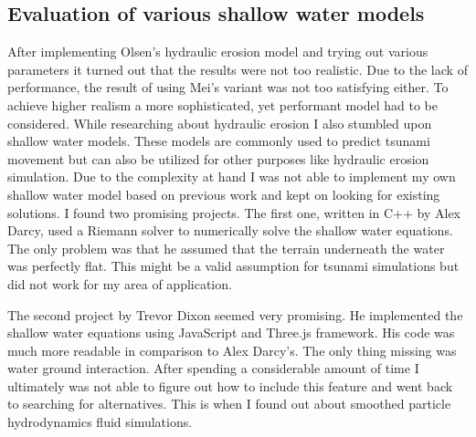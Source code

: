 \documentclass[11pt,a4paper,twoside,openright]{report}
\begin{document}
\subsection{Evaluation of various shallow water models}
After implementing Olsen's hydraulic erosion model and trying out various parameters it turned out that the results were not too realistic. Due to the lack of performance, the result of using Mei's variant was not too satisfying either. To achieve higher realism a more sophisticated, yet performant model had to be considered. While researching about hydraulic erosion I also stumbled upon shallow water models. These models are commonly used to predict tsunami movement but can also be utilized for other purposes like hydraulic erosion simulation. Due to the complexity at hand I was not able to implement my own shallow water model based on previous work and kept on looking for existing solutions. I found two promising projects. The first one, written in C++ by Alex Darcy, used a Riemann solver to numerically solve the shallow water equations. The only problem was that he assumed that the terrain underneath the water was perfectly flat. This might be a valid assumption for tsunami simulations but did not work for my area of application.

The second project by Trevor Dixon seemed very promising. He implemented the shallow water equations using JavaScript and Three.js framework. His code was much more readable in comparison to Alex Darcy's. The only thing missing was water ground interaction. After spending a considerable amount of time I ultimately was not able to figure out how to include this feature and went back to searching for alternatives. This is when I found out about smoothed particle hydrodynamics fluid simulations.
\end{document}
